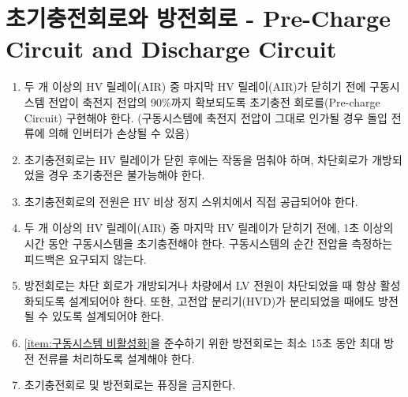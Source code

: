 \documentclass[final,a4paper,10pt]{report}
\begin{document}
\section{초기충전회로와 방전회로 - Pre-Charge Circuit and Discharge Circuit}
\begin{enumerate}
  \item 두 개 이상의 HV 릴레이(AIR) 중 마지막 HV 릴레이(AIR)가 닫히기 전에 구동시스템 전압이 축전지 전압의 90\%까지 확보되도록 초기충전 회로를(Pre-charge Circuit) 구현해야 한다. (구동시스템에 축전지 전압이 그대로 인가될 경우 돌입 전류에 의해 인버터가 손상될 수 있음)
  \item 초기충전회로는 HV 릴레이가 닫힌 후에는 작동을 멈춰야 하며, 차단회로가 개방되었을 경우 초기충전은 불가능해야 한다.
  \item 초기충전회로의 전원은 HV 비상 정지 스위치에서 직접 공급되어야 한다.
  \item 두 개 이상의 HV 릴레이(AIR) 중 마지막 HV 릴레이가 닫히기 전에, 1초 이상의 시간 동안 구동시스템을 초기충전해야 한다. 구동시스템의 순간 전압을 측정하는 피드백은 요구되지 않는다.
  \item 방전회로는 차단 회로가 개방되거나 차량에서 LV 전원이 차단되었을 때 항상 활성화되도록 설계되어야 한다. 또한, 고전압 분리기(HVD)가 분리되었을 때에도 방전될 수 있도록 설계되어야 한다.
  \item \cref{item:구동시스템 비활성화}을 준수하기 위한 방전회로는 최소 15초 동안 최대 방전 전류를 처리하도록 설계해야 한다.
  \item 초기충전회로 및 방전회로는 퓨징을 금지한다.
\end{enumerate}
\end{document}
